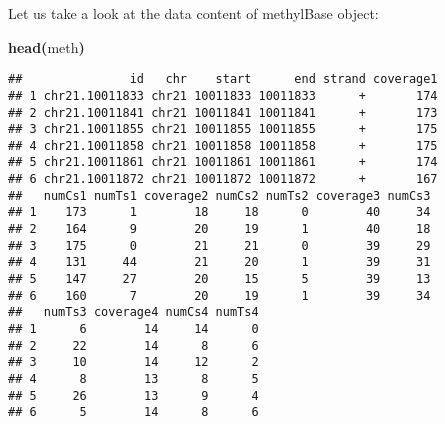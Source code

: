 \documentclass{article}
\makeatletter
\newcommand{\hlfunctioncall}[1]{\textcolor[rgb]{.5,0,.33}{\textbf{#1}}}%
\newcommand{\hlkeyword}[1]{\textbf{#1}}%
\newcommand{\hlsymbol}[1]{#1}%
\newenvironment{kframe}{%
 \def\FrameCommand##1{\hskip\@totalleftmargin \hskip-\fboxsep
 \colorbox{shadecolor}{##1}\hskip-\fboxsep
     \hskip-\linewidth \hskip-\@totalleftmargin \hskip\columnwidth}%
 \MakeFramed {\advance\hsize-\width
   \@totalleftmargin\z@ \linewidth\hsize
   \@setminipage}}%
 {\par\unskip\endMakeFramed}
\newenvironment{knitrout}{}{} %
\makeatother
\begin{document}
Let us take a look at the data content of methylBase object:
\begin{knitrout}
\color{fgcolor}\begin{kframe}
\begin{flushleft}
\ttfamily\noindent
\hlfunctioncall{head}\hlkeyword{(}\hlsymbol{meth}\hlkeyword{)}\mbox{}
\normalfont
\end{flushleft}
\begin{verbatim}
##               id   chr    start      end strand coverage1
## 1 chr21.10011833 chr21 10011833 10011833      +       174
## 2 chr21.10011841 chr21 10011841 10011841      +       173
## 3 chr21.10011855 chr21 10011855 10011855      +       175
## 4 chr21.10011858 chr21 10011858 10011858      +       175
## 5 chr21.10011861 chr21 10011861 10011861      +       174
## 6 chr21.10011872 chr21 10011872 10011872      +       167
##   numCs1 numTs1 coverage2 numCs2 numTs2 coverage3 numCs3
## 1    173      1        18     18      0        40     34
## 2    164      9        20     19      1        40     18
## 3    175      0        21     21      0        39     29
## 4    131     44        21     20      1        39     31
## 5    147     27        20     15      5        39     13
## 6    160      7        20     19      1        39     34
##   numTs3 coverage4 numCs4 numTs4
## 1      6        14     14      0
## 2     22        14      8      6
## 3     10        14     12      2
## 4      8        13      8      5
## 5     26        13      9      4
## 6      5        14      8      6
\end{verbatim}
\end{kframe}
\end{knitrout}
\end{document}

